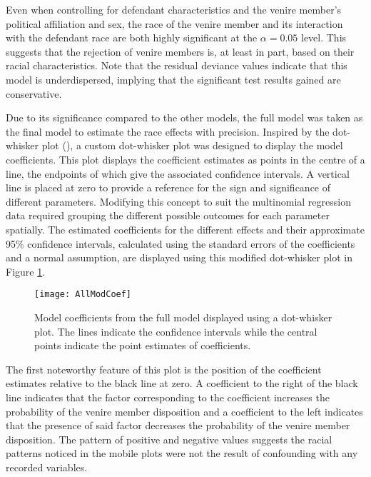 Even when controlling for defendant characteristics and the venire member's political affiliation and sex, the race of the venire
member and its interaction with the defendant race are both highly significant at the $\alpha = 0.05$ level. This suggests that
the rejection of venire members is, at least in part, based on their racial characteristics. Note that the residual deviance values indicate that this model
is underdispersed, implying that the significant test results gained
are conservative.

Due to its significance compared to the other models, the full model was taken as the final model to estimate the race effects
with precision. Inspired by the dot-whisker plot (\cite{dotwhisker}), a custom dot-whisker plot was designed to display the model coefficients. This plot displays the coefficient estimates as points in the centre of a line, the endpoints of which
give the associated confidence intervals. A vertical line is placed at zero to provide a reference for the sign and significance
of different parameters. Modifying this concept to suit the multinomial regression data required grouping
the different possible outcomes for each parameter spatially. The estimated coefficients for the different effects and their approximate 95\% confidence intervals, calculated using the standard errors of the coefficients and a normal assumption, are displayed using this modified dot-whisker plot in Figure \ref{fig:modallcoef}.

\begin{figure}[h!]
  \centering
  \texttt{[image: AllModCoef]}
  \caption[All Model Coefficients]{\footnotesize Model coefficients from the full model displayed using
    a dot-whisker plot. The lines indicate the confidence intervals while the central points indicate the point estimates of
    coefficients.}
  \label{fig:modallcoef}
\end{figure}


The first noteworthy feature of this plot is the position of the
coefficient estimates relative to the black line at zero. A
coefficient to the right of the black line indicates that the factor
corresponding to the coefficient increases the probability of the
venire member disposition and a coefficient to the left indicates that the presence of said factor decreases the
probability of the venire member disposition. The pattern of positive and negative values suggests the racial patterns
noticed in the mobile plots were not the result of confounding with any recorded variables.

